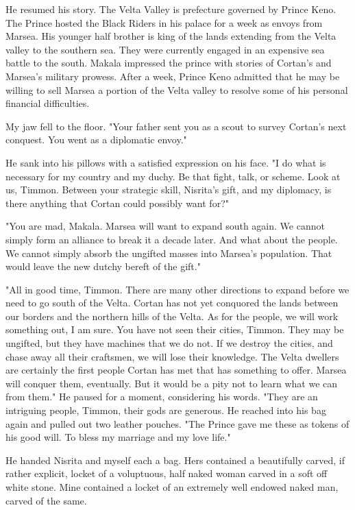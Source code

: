 \documentclass{article}
\begin{document}
He resumed his story. The Velta Valley is prefecture governed by Prince Keno. The Prince hosted the Black Riders in his palace for a week as envoys from Marsea. His younger half brother is king of the lands extending from the Velta valley to the southern sea. They were currently engaged in an expensive sea battle to the south. Makala impressed the prince with stories of Cortan's and Marsea's military prowess. After a week, Prince Keno admitted that he may be willing to sell Marsea a portion of the Velta valley to resolve some of his personal financial difficulties. 

My jaw fell to the floor. "Your father sent you as a scout to survey Cortan's next conquest. You went as a diplomatic envoy."

He sank into his pillows with a satisfied expression on his face. "I do what is necessary for my country and my duchy. Be that fight, talk, or scheme. Look at us, Timmon. Between your strategic skill, Nisrita's gift, and my diplomacy, is there anything that Cortan could possibly want for?"

"You are mad, Makala. Marsea will want to expand south again. We cannot simply form an alliance to break it a decade later. And what about the people. We cannot simply absorb the ungifted masses into Marsea's population. That would leave the new dutchy bereft of the gift."

"All in good time, Timmon. There are many other directions to expand before we need to go south of the Velta. Cortan has not yet conquored the lands between our borders and the northern hills of the Velta. As for the people, we will work something out, I am sure. You have not seen their cities, Timmon. They may be ungifted, but they have machines that we do not. If we destroy the cities, and chase away all their craftsmen, we will lose their knowledge. The Velta dwellers are certainly the first people Cortan has met that has something to offer. Marsea will conquer them, eventually. But it would be a pity not to learn what we can from them." He paused for a moment, considering his words. "They are an intriguing people, Timmon, their gods are generous. He reached into his bag again and pulled out two leather pouches. "The Prince gave me these as tokens of his good will. To bless my marriage and my love life." 

He handed Nisrita and myself each a bag. Hers contained a beautifully carved, if rather explicit, locket of a voluptuous, half naked woman carved in a soft off white stone. Mine contained a locket of an extremely well endowed naked man, carved of the same. 
\end{document}
